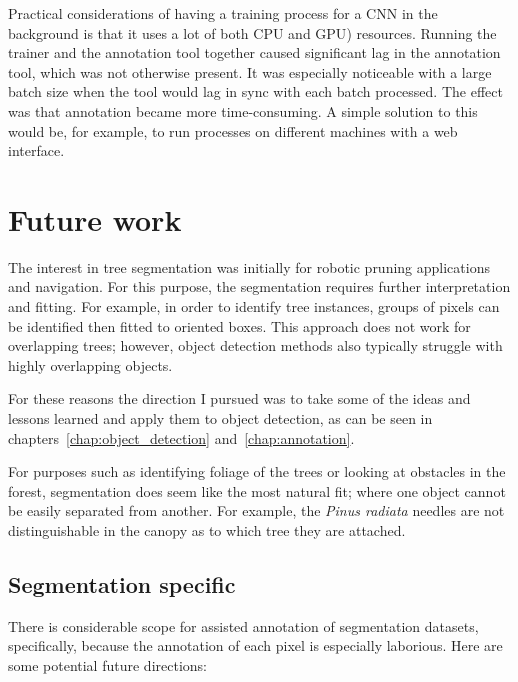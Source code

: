 Practical considerations of having a training process for a \gls{CNN} in the background is that it uses a lot of both \gls{CPU} and \gls{GPU}) resources. Running the trainer and the annotation tool together caused significant lag in the annotation tool, which was not otherwise present. It was especially noticeable with a large batch size when the tool would lag in sync with each batch processed. The effect was that annotation became more time-consuming. A simple solution to this would be, for example, to run processes on different machines with a web interface.


\section{Future work}

The interest in tree segmentation was initially for robotic pruning applications and navigation. For this purpose, the segmentation requires further interpretation and fitting. For example, in order to identify tree instances, groups of pixels can be identified then fitted to oriented boxes. This approach does not work for overlapping trees; however, object detection methods also typically struggle with highly overlapping objects.

For these reasons the direction I pursued was to take some of the ideas and lessons learned and apply them to object detection, as can be seen in chapters~\ref {chap:object_detection} and~\ref {chap:annotation}.

For purposes such as identifying foliage of the trees or looking at obstacles in the forest, segmentation does seem like the most natural fit; where one object cannot be easily separated from another. For example, the \emph{Pinus radiata} needles are not distinguishable in the canopy as to which tree they are attached.

\subsection{Segmentation specific}

There is considerable scope for assisted annotation of segmentation datasets, specifically, because the annotation of each pixel is especially laborious. Here are some potential future directions: 

